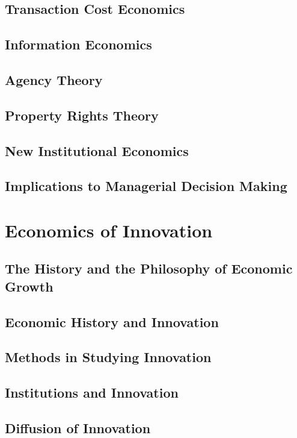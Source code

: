 \documentclass[12pt,letterpaper]{article}
\begin{document}
\subsection{Transaction Cost Economics}
\subsection{Information Economics}
\subsection{Agency Theory}
\subsection{Property Rights Theory}
\subsection{New Institutional Economics}
\subsection{Implications to Managerial Decision Making}


\newpage

\section{Economics of Innovation}
\subsection{The History and the Philosophy of Economic Growth}
\subsection{Economic History and Innovation}
\subsection{Methods in Studying Innovation}
\subsection{Institutions and Innovation}
\subsection{Diffusion of Innovation}
\end{document}
